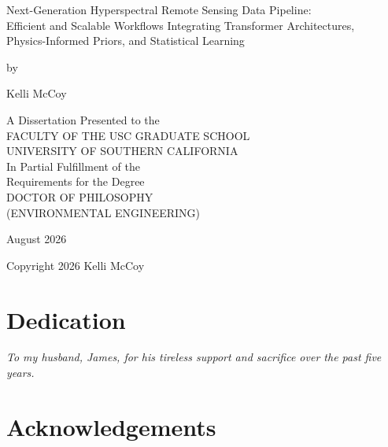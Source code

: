 \documentclass[11pt]{report}
\begin{document}
\thispagestyle{empty}
\begin{center}
\vspace*{1in}

Next-Generation Hyperspectral Remote Sensing Data Pipeline:\\
Efficient and Scalable Workflows Integrating Transformer Architectures,\\
Physics-Informed Priors, and Statistical Learning

\vspace{0.5in}
by

\vspace{0.5in}
Kelli McCoy

\vspace{1in}
A Dissertation Presented to the\\
FACULTY OF THE USC GRADUATE SCHOOL\\
UNIVERSITY OF SOUTHERN CALIFORNIA\\
In Partial Fulfillment of the\\
Requirements for the Degree\\
DOCTOR OF PHILOSOPHY\\
(ENVIRONMENTAL ENGINEERING)

\vspace{0.75in}
August 2026

\end{center}

\vfill
\noindent Copyright 2026 \hfill Kelli McCoy

\newpage

\setcounter{page}{2}

\chapter*{Dedication}

\vspace*{2in}
\begin{center}
\textit{To my husband, James, for his tireless support and sacrifice over the past five years.}
\end{center}

\newpage

\chapter*{Acknowledgements}
\end{document}
